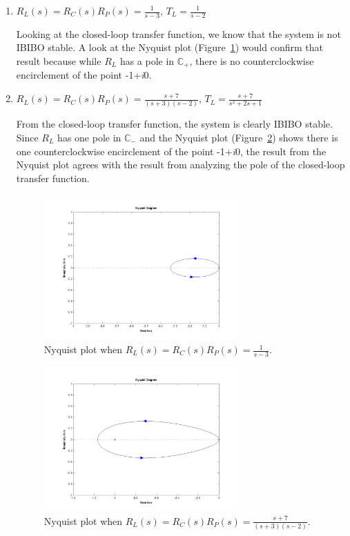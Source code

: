 \begin{enumerate}
\item $R_{L}(s)=R_{C}(s)R_{P}(s)=\frac{1}{s-3}$,
$T_{L}=\frac{1}{s-2}$

Looking at the closed-loop transfer function, we know that the
system is not IBIBO stable.  A look at the Nyquist plot
(Figure~\ref{fig:unstable}) would confirm that result because
while $R_{L}$ has a pole in $\mathbb{C}_{+}$, there is no
counterclockwise encirclement of the point -1+\emph{i}0.

\item $R_{L}(s)=R_{C}(s)R_{P}(s)=\frac{s+7}{(s+3)(s-2)}$,
$T_{L}=\frac{s+7}{s^{2}+2s+1}$

From the closed-loop transfer function, the system is clearly
IBIBO stable.  Since $R_{L}$ has one pole in $\mathbb{C}_{-}$ and
the Nyquist plot (Figure~\ref{fig:stable}) shows there is one
counterclockwise encirclement of the point -1+\emph{i}0, the
result from the Nyquist plot agrees with the result from analyzing
the pole of the closed-loop transfer function.


\begin{figure}
\centering
\includegraphics[width=0.7\textwidth]{pix/matheg1.jpg} 
\caption{Nyquist plot when $R_{L}(s)=R_{C}(s)R_{P}(s)=\frac{1}{s-3}$.}
\label{fig:unstable}
\end{figure}

\begin{figure}
\centering
\includegraphics[width=0.7\textwidth]{pix/matheg2.jpg}
\caption{Nyquist plot when $R_{L}(s)=R_{C}(s)R_{P}(s)=\frac{s+7}{(s+3)(s-2)}$.} 
\label{fig:stable}
\end{figure}

\end{enumerate}

